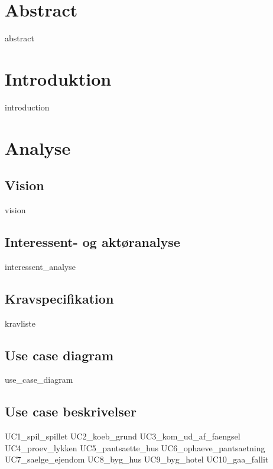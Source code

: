 \documentclass{article}
\begin{document}
{\selectfont

\thispagestyle{empty}
\newpage
\section*{Abstract}
{abstract}
\thispagestyle{empty}
\newpage
\tableofcontents
\thispagestyle{empty}
\newpage
\clearpage
\setcounter{page}{1}

\section{Introduktion}
{introduction}

\section{Analyse}
\subsection{Vision}
{vision}

\subsection{Interessent- og aktøranalyse}
{interessent_analyse}
\subsection{Kravspecifikation}
{kravliste}

\subsection{Use case diagram}
{use_case_diagram}
\newpage
\subsection{Use case beskrivelser}
{UC1_spil_spillet}
{UC2_koeb_grund}
{UC3_kom_ud_af_faengsel}
{UC4_proev_lykken}
{UC5_pantsaette_hus}
{UC6_ophaeve_pantsaetning}
{UC7_saelge_ejendom}
{UC8_byg_hus}
{UC9_byg_hotel}
{UC10_gaa_fallit}
\newpage
}
\end{document}
